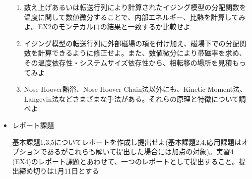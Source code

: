 \documentclass{jarticle}
\begin{document}
\begin{itemize}
\begin{enumerate}
  \item 数え上げあるいは転送行列により計算されたイジング模型の分配関数を温度に関して数値微分することで、内部エネルギー、比熱を計算してみよ。EX2のモンテカルロの結果と一致するか比較せよ
  \item イジング模型の転送行列に外部磁場の項を付け加え、磁場下での分配関数を計算できるように修正せよ。また、数値微分により帯磁率を求め、その温度依存性・システムサイズ依存性から、相転移の場所を見積もってみよ
  \item Nose-Hoover熱浴、Nose-Hoover Chain法以外にも、Kinetic-Moment法、Langevin法などさまざまな手法がある。それらの原理と特徴について調べよ
  \end{enumerate}

\item レポート課題

基本課題1,3,5についてレポートを作成し提出せよ(基本課題2,4,応用課題はオプションであるがこれらも解いて提出した場合には加点の対象)。実習4 (EX4)のレポート課題とあわせて、一つのレポートとして提出すること。提出締め切りは1月11日とする

\end{itemize}
\end{document}
